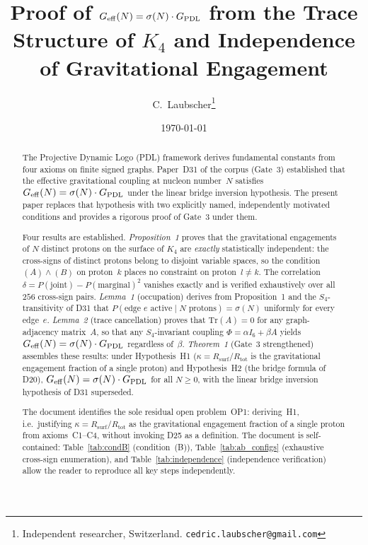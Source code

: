 \documentclass[11pt,a4paper]{article}
\theoremstyle{definition}
\newcommand{\PDL}{\textnormal{PDL}}
\newcommand{\Rsurf}{R_{\mathrm{surf}}}
\newcommand{\Rtot}{R_{\mathrm{tot}}}
\newcommand{\GPDL}{G_{\PDL}}
\newcommand{\Geff}{G_{\mathrm{eff}}}
\newcommand{\sig}{\sigma}
\newcommand{\kap}{\kappa}
\newcommand{\Kfour}{K_4}
\begin{document}
\title{Proof of $G_{\mathrm{eff}}(N) = \sigma(N)\cdot G_{\PDL}$ from the Trace Structure of $K_4$ and Independence of Gravitational Engagement}
\author{C.~Laubscher\thanks{Independent researcher, Switzerland. \texttt{cedric.laubscher@gmail.com}}}
\date{\small \today}
\maketitle

\begin{abstract}
The Projective Dynamic Logo (\PDL) framework derives fundamental constants from four axioms on finite signed graphs. Paper~D31 of the corpus (Gate~3) established that the effective gravitational coupling at nucleon number~$N$ satisfies $\Geff(N) = \sig(N)\cdot\GPDL$ under the linear bridge inversion hypothesis. The present paper replaces that hypothesis with two explicitly named, independently motivated conditions and provides a rigorous proof of Gate~3 under them.

Four results are established. \emph{Proposition~1} proves that the gravitational engagements of $N$ distinct protons on the surface of $\Kfour$ are \emph{exactly} statistically independent: the cross-signs of distinct protons belong to disjoint variable spaces, so the condition $(A)\wedge(B)$ on proton~$k$ places no constraint on proton~$l\neq k$. The correlation $\delta = P(\text{joint}) - P(\text{marginal})^2$ vanishes exactly and is verified exhaustively over all $256$ cross-sign pairs. \emph{Lemma~1} (occupation) derives from Proposition~1 and the $S_4$-transitivity of D31 that $P(\text{edge } e \text{ active}\mid N \text{ protons}) = \sig(N)$ uniformly for every edge~$e$. \emph{Lemma~2} (trace cancellation) proves that $\mathrm{Tr}(A) = 0$ for any graph-adjacency matrix~$A$, so that any $S_4$-invariant coupling $\Phi = \alpha I_6 + \beta A$ yields $G_{\mathrm{eff}}(N) = \sig(N)\cdot\GPDL$ regardless of~$\beta$. \emph{Theorem~1} (Gate~3 strengthened) assembles these results: under Hypothesis~H1 ($\kap = \Rsurf/\Rtot$ is the gravitational engagement fraction of a single proton) and Hypothesis~H2 (the bridge formula of D20), $\Geff(N) = \sig(N)\cdot\GPDL$ for all $N\geq 0$, with the linear bridge inversion hypothesis of D31 superseded.

The document identifies the sole residual open problem~OP1: deriving~H1, i.e.\ justifying $\kap = \Rsurf/\Rtot$ as the gravitational engagement fraction of a single proton from axioms~C1--C4, without invoking D25 as a definition. The document is self-contained: Table~\ref{tab:condB} (condition~(B)), Table~\ref{tab:ab_configs} (exhaustive cross-sign enumeration), and Table~\ref{tab:independence} (independence verification) allow the reader to reproduce all key steps independently.
\end{abstract}
\end{document}
